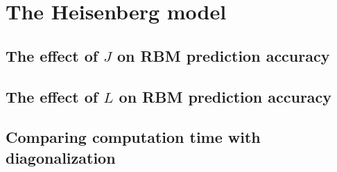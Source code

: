 \section{The Heisenberg model}
\subsection{The effect of \texorpdfstring{$J$}{J} on RBM prediction accuracy}
\subsection{The effect of \texorpdfstring{$L$}{L} on RBM prediction accuracy}
\subsection{Comparing computation time with diagonalization}
